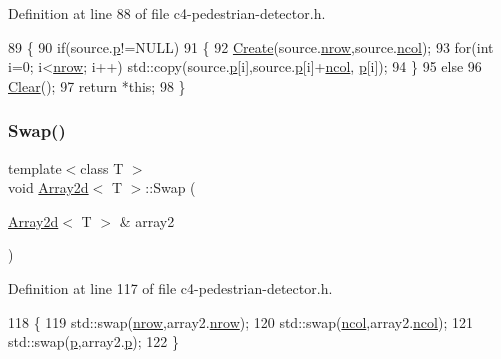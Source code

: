 Definition at line 88 of file c4-\/pedestrian-\/detector.\+h.


\begin{DoxyCode}
89 \{
90     \textcolor{keywordflow}{if}(source.\mbox{\hyperlink{class_array2d_ac7b70bc423364c43c7c174cdde515380}{p}}!=NULL)
91     \{
92         \mbox{\hyperlink{class_array2d_af1d2cec0973cedfe74ae5b967532922f}{Create}}(source.\mbox{\hyperlink{class_array2d_a373dd63664bee40ef720d183d03e5bdb}{nrow}},source.\mbox{\hyperlink{class_array2d_afe48cd05774cae5b6872324ae49e089b}{ncol}});
93         \textcolor{keywordflow}{for}(\textcolor{keywordtype}{int} i=0; i<\mbox{\hyperlink{class_array2d_a373dd63664bee40ef720d183d03e5bdb}{nrow}}; i++) std::copy(source.\mbox{\hyperlink{class_array2d_ac7b70bc423364c43c7c174cdde515380}{p}}[i],source.\mbox{\hyperlink{class_array2d_ac7b70bc423364c43c7c174cdde515380}{p}}[i]+\mbox{\hyperlink{class_array2d_afe48cd05774cae5b6872324ae49e089b}{ncol}},
      \mbox{\hyperlink{class_array2d_ac7b70bc423364c43c7c174cdde515380}{p}}[i]);
94     \}
95     \textcolor{keywordflow}{else}
96         \mbox{\hyperlink{class_array2d_a9902a80867777fbf3ba64a6d8c10606e}{Clear}}();
97     \textcolor{keywordflow}{return} *\textcolor{keyword}{this};
98 \}
\end{DoxyCode}
\mbox{\label{class_array2d_a24e1766701c30e14fa39bfcb1024bd1a}} 
\subsubsection{\texorpdfstring{Swap()}{Swap()}}
{\footnotesize\ttfamily template$<$class T $>$ \\
void \mbox{\hyperlink{class_array2d}{Array2d}}$<$ T $>$\+::Swap (\begin{DoxyParamCaption}\item[{\mbox{\hyperlink{class_array2d}{Array2d}}$<$ T $>$ \&}]{array2 }\end{DoxyParamCaption})}



Definition at line 117 of file c4-\/pedestrian-\/detector.\+h.


\begin{DoxyCode}
118 \{
119     std::swap(\mbox{\hyperlink{class_array2d_a373dd63664bee40ef720d183d03e5bdb}{nrow}},array2.\mbox{\hyperlink{class_array2d_a373dd63664bee40ef720d183d03e5bdb}{nrow}});
120     std::swap(\mbox{\hyperlink{class_array2d_afe48cd05774cae5b6872324ae49e089b}{ncol}},array2.\mbox{\hyperlink{class_array2d_afe48cd05774cae5b6872324ae49e089b}{ncol}});
121     std::swap(\mbox{\hyperlink{class_array2d_ac7b70bc423364c43c7c174cdde515380}{p}},array2.\mbox{\hyperlink{class_array2d_ac7b70bc423364c43c7c174cdde515380}{p}});
122 \}
\end{DoxyCode}
\mbox{\label{class_array2d_a84070672548d19a9e77b4321527637e0}} 

